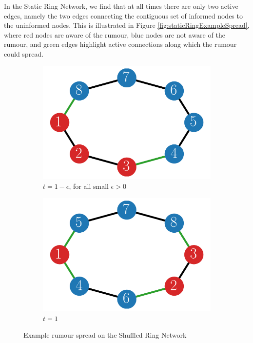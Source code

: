 
In the Static Ring Network, we find that at all times there are only two active edges, namely the two edges connecting the contiguous set of informed nodes to the uninformed nodes.  This is illustrated in Figure \ref{fig:staticRingExampleSpread}, where red nodes are aware of the rumour, blue nodes are not aware of the rumour, and green edges highlight active connections along which the rumour could spread.


\begin{figure}[h]
	\centering
    \begin{subfigure}[b]{0.49\textwidth}
		\centering
		\includegraphics[width=\textwidth]{./figures/static_ring_example_spread.png}
		\caption*{$t=1 - \epsilon$, for all small $\epsilon > 0$}
	\end{subfigure}
	\begin{subfigure}[b]{0.49\textwidth}
		\centering
		\includegraphics[width=\textwidth]{./figures/shuffled_ring_example_spread.png}
		\caption*{$t=1$}
	\end{subfigure}
	\caption{Example rumour spread on the Shuffled Ring Network}
	\label{fig:shuffledRingExampleSpread}
\end{figure}

